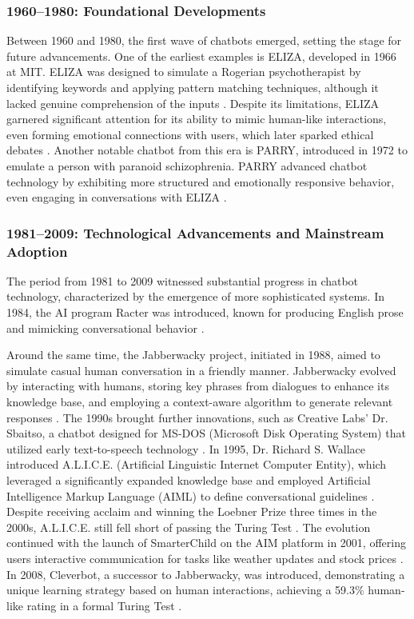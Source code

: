 \subsubsection{1960–1980: Foundational Developments}

Between 1960 and 1980, the first wave of chatbots emerged, setting the stage for future advancements. One of the earliest examples is ELIZA, developed in 1966 at MIT. ELIZA was designed to simulate a Rogerian psychotherapist by identifying keywords and applying pattern matching techniques, although it lacked genuine comprehension of the inputs \cite{weizenbaum1966eliza}. Despite its limitations, ELIZA garnered significant attention for its ability to mimic human-like interactions, even forming emotional connections with users, which later sparked ethical debates \cite{zimmerman2023human}. Another notable chatbot from this era is PARRY, introduced in 1972 to emulate a person with paranoid schizophrenia. PARRY advanced chatbot technology by exhibiting more structured and emotionally responsive behavior, even engaging in conversations with ELIZA \cite{colby1971artificial}.

\subsubsection{1981–2009: Technological Advancements and Mainstream Adoption}

The period from 1981 to 2009 witnessed substantial progress in chatbot technology, characterized by the emergence of more sophisticated systems. In 1984, the AI program Racter was introduced, known for producing English prose and mimicking conversational behavior \cite{wikipedia2023racter}. 

Around the same time, the Jabberwacky project, initiated in 1988, aimed to simulate casual human conversation in a friendly manner. Jabberwacky evolved by interacting with humans, storing key phrases from dialogues to enhance its knowledge base, and employing a context-aware algorithm to generate relevant responses \cite{shawar2007fostering}. The 1990s brought further innovations, such as Creative Labs' Dr. Sbaitso, a chatbot designed for MS-DOS (Microsoft Disk Operating System) that utilized early text-to-speech technology \cite{deryugina2010chatterbots}. In 1995, Dr. Richard S. Wallace introduced A.L.I.C.E. (Artificial Linguistic Internet Computer Entity), which leveraged a significantly expanded knowledge base and employed Artificial Intelligence Markup Language (AIML) to define conversational guidelines \cite{wallace2009anatomy}. Despite receiving acclaim and winning the Loebner Prize three times in the 2000s, A.L.I.C.E. still fell short of passing the Turing Test \cite{shum2018eliza}. The evolution continued with the launch of SmarterChild on the AIM platform in 2001, offering users interactive communication for tasks like weather updates and stock prices \cite{adamopoulou2020chatbots}. In 2008, Cleverbot, a successor to Jabberwacky, was introduced, demonstrating a unique learning strategy based on human interactions, achieving a 59.3\% human-like rating in a formal Turing Test \cite{wikipedia2023cleverbot}.


